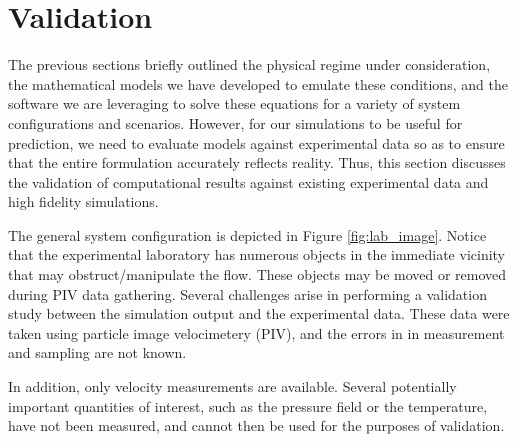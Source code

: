 
\section{Validation}
\label{sec:validation}

%
%

The previous sections briefly outlined the physical regime under
consideration, the mathematical models we have developed to emulate
these conditions, and the software we are leveraging to solve these
equations for a variety of system configurations and scenarios. 
However, for our simulations to be useful for prediction, we
need to evaluate models against experimental data so
as to ensure that the entire formulation accurately reflects reality. 
Thus, this section discusses the validation of computational results
against existing experimental data and high fidelity simulations.

%
%

The general system configuration is depicted
in Figure \ref{fig:lab_image}. 
Notice that the experimental laboratory has numerous objects
in the immediate vicinity that may obstruct/manipulate the flow. These
objects may be moved or removed during PIV data gathering.  
Several challenges arise in performing a validation study between the
simulation output and the experimental data. These data were taken using
particle image velocimetery (PIV), and the errors in 
in measurement and sampling are not known. 



In addition, only velocity measurements are available. Several
potentially important quantities of interest, such as the pressure field
or the temperature, have not been measured, and cannot then be used for
the purposes of validation. 


%
%
%
% 
%
%


